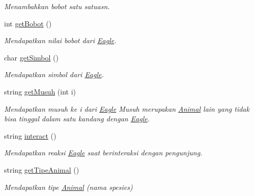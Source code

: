 \begin{DoxyCompactItemize}
\begin{DoxyCompactList}\small\item\em Menambahkan bobot satu satuasn. \end{DoxyCompactList}\item 
int \hyperlink{classEagle_a15ec50591c567e370b8b5811ea3724c9}{get\-Bobot} ()
\begin{DoxyCompactList}\small\item\em Mendapatkan nilai bobot dari \hyperlink{classEagle}{Eagle}. \end{DoxyCompactList}\item 
char \hyperlink{classEagle_a4f15b35b579496054a80f6bf9ac5e4f8}{get\-Simbol} ()
\begin{DoxyCompactList}\small\item\em Mendapatkan simbol dari \hyperlink{classEagle}{Eagle}. \end{DoxyCompactList}\item 
string \hyperlink{classEagle_ab0082d6c81ae02d38cf87ffd8844b1f6}{get\-Musuh} (int i)
\begin{DoxyCompactList}\small\item\em Mendapatkan musuh ke i dari \hyperlink{classEagle}{Eagle} Musuh merupakan \hyperlink{classAnimal}{Animal} lain yang tidak bisa tinggal dalam satu kandang dengan \hyperlink{classEagle}{Eagle}. \end{DoxyCompactList}\item 
string \hyperlink{classEagle_a698f925269924e7e9f9b9c92899de01d}{interact} ()
\begin{DoxyCompactList}\small\item\em Mendapatkan reaksi \hyperlink{classEagle}{Eagle} saat berinteraksi dengan pengunjung. \end{DoxyCompactList}\item 
string \hyperlink{classEagle_af9d6c21fd2e046487b3490bb12ad3d6e}{get\-Tipe\-Animal} ()
\begin{DoxyCompactList}\small\item\em Mendapatkan tipe \hyperlink{classAnimal}{Animal} (nama spesies) \end{DoxyCompactList}\end{DoxyCompactItemize}
